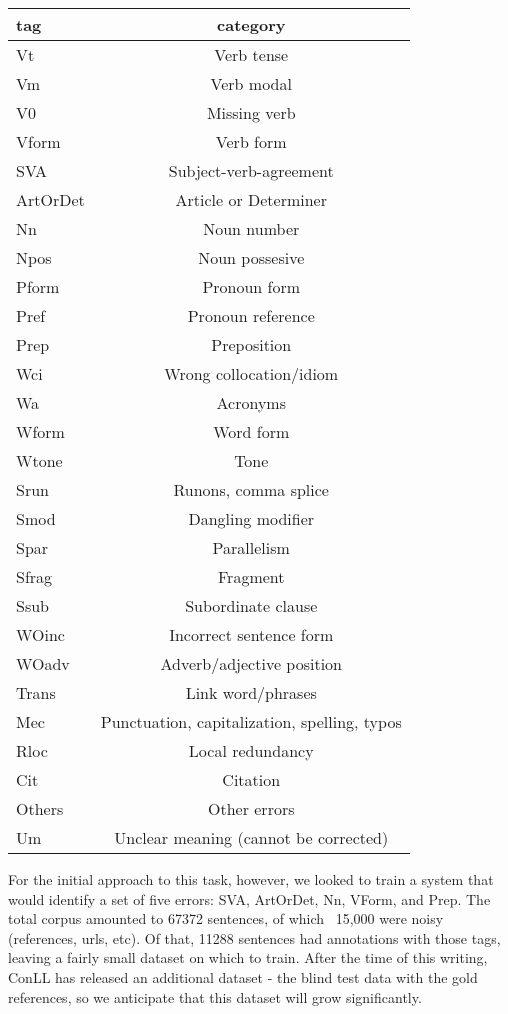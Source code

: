 \documentclass[11pt,letterpaper]{article}
\begin{document}
\begin{tabular}{| l | c |}
  \hline
  tag & category \\
  \hline
  Vt & Verb tense \\
  Vm & Verb modal \\
  V0 & Missing verb \\ 
  Vform & Verb form \\
  SVA & Subject-verb-agreement \\
  ArtOrDet & Article or Determiner \\
  Nn & Noun number \\
  Npos & Noun possesive \\
  Pform & Pronoun form \\
  Pref & Pronoun reference \\
  Prep & Preposition \\
  Wci & Wrong collocation/idiom \\
  Wa & Acronyms \\
  Wform & Word form \\
  Wtone & Tone \\
  Srun & Runons, comma splice \\
  Smod & Dangling modifier \\
  Spar & Parallelism \\
  Sfrag & Fragment \\
  Ssub & Subordinate clause \\
  WOinc & Incorrect sentence form \\
  WOadv & Adverb/adjective position \\
  Trans & Link word/phrases \\
  Mec & Punctuation, capitalization, spelling, typos \\
  Rloc & Local redundancy \\
  Cit & Citation \\
  Others & Other errors \\
  Um & Unclear meaning (cannot be corrected) \\
  \hline
\end{tabular}

For the initial approach to this task, however, we looked to train a system that would identify a set of five errors: SVA, ArtOrDet, Nn, VForm, and Prep. The total corpus amounted to 67372 sentences, of which ~15,000 were noisy (references, urls, etc). Of that, 11288 sentences had annotations with those tags, leaving a fairly small dataset on which to train. After the time of this writing, ConLL has released an additional dataset - the blind test data with the gold references, so we anticipate that this dataset will grow significantly.
\end{document}
